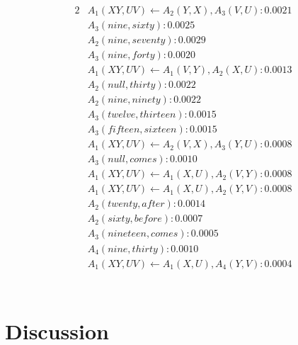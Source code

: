\documentclass[11pt, twocolumn]{article}
\begin{document}
\begin{alignat*}{2}
&A_1(X Y, U V) \leftarrow A_2(Y, X), A_3(V, U) : 0.0021 \\
&A_3(nine, sixty) : 0.0025 \\
&A_2(nine, seventy) : 0.0029 \\
&A_3(nine, forty) : 0.0020 \\
&A_1(X Y, U V) \leftarrow A_1(V, Y), A_2(X, U) : 0.0013 \\
&A_2(null, thirty) : 0.0022 \\
&A_2(nine, ninety) : 0.0022 \\
&A_3(twelve, thirteen) : 0.0015 \\
&A_3(fifteen, sixteen) : 0.0015 \\
&A_1(X Y, U V) \leftarrow A_2(V, X), A_3(Y, U) : 0.0008 \\
&A_3(null, comes) : 0.0010 \\
&A_1(X Y, U V) \leftarrow A_1(X, U), A_2(V, Y) : 0.0008 \\
&A_1(X Y, U V) \leftarrow A_1(X, U), A_2(Y, V) : 0.0008 \\
&A_2(twenty, after) : 0.0014 \\
&A_2(sixty, before) : 0.0007 \\
&A_3(nineteen, comes) : 0.0005 \\
&A_4(nine, thirty) : 0.0010 \\
&A_1(X Y, U V) \leftarrow A_1(X, U), A_4(Y, V) : 0.0004 \\
\end{alignat*} \\
\section{Discussion}

\end{document}
